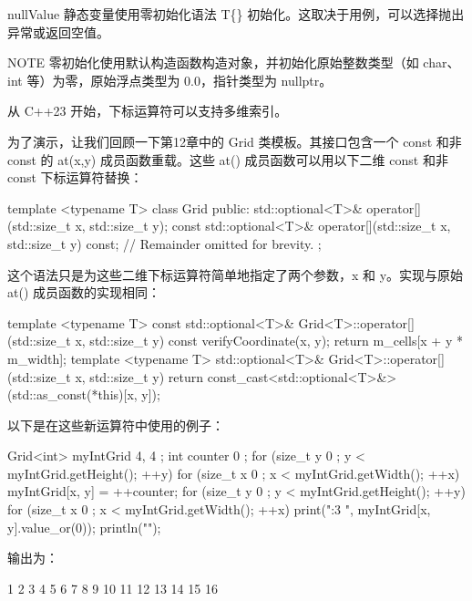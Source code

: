 nullValue 静态变量使用零初始化语法 T\{\} 初始化。这取决于用例，可以选择抛出异常或返回空值。

\begin{myNotic}{NOTE}
零初始化使用默认构造函数构造对象，并初始化原始整数类型（如 char、int 等）为零，原始浮点类型为 0.0，指针类型为 nullptr。
\end{myNotic}



从 C++23 开始，下标运算符可以支持多维索引。

为了演示，让我们回顾一下第12章中的 Grid 类模板。其接口包含一个 const 和非 const 的 at(x,y) 成员函数重载。这些 at() 成员函数可以用以下二维 const 和非 const 下标运算符替换：

\begin{cpp}
template <typename T>
class Grid
{
    public:
        std::optional<T>& operator[](std::size_t x, std::size_t y);
        const std::optional<T>& operator[](std::size_t x, std::size_t y) const;
        // Remainder omitted for brevity.
};
\end{cpp}

这个语法只是为这些二维下标运算符简单地指定了两个参数，x 和 y。实现与原始 at() 成员函数的实现相同：

\begin{cpp}
template <typename T>
const std::optional<T>& Grid<T>::operator[](std::size_t x, std::size_t y) const
{
    verifyCoordinate(x, y);
    return m_cells[x + y * m_width];
}
template <typename T>
std::optional<T>& Grid<T>::operator[](std::size_t x, std::size_t y)
{
    return const_cast<std::optional<T>&>(std::as_const(*this)[x, y]);
}
\end{cpp}

以下是在这些新运算符中使用的例子：

\begin{cpp}
Grid<int> myIntGrid { 4, 4 };
int counter { 0 };
for (size_t y { 0 }; y < myIntGrid.getHeight(); ++y) {
    for (size_t x { 0 }; x < myIntGrid.getWidth(); ++x) {
        myIntGrid[x, y] = ++counter;
    }
}
for (size_t y { 0 }; y < myIntGrid.getHeight(); ++y) {
    for (size_t x { 0 }; x < myIntGrid.getWidth(); ++x) {
        print("{:3} ", myIntGrid[x, y].value_or(0));
    }
    println("");
}
\end{cpp}

输出为：

\begin{shell}
 1  2  3  4
 5  6  7  8
 9 10 11 12
13 14 15 16
\end{shell}


